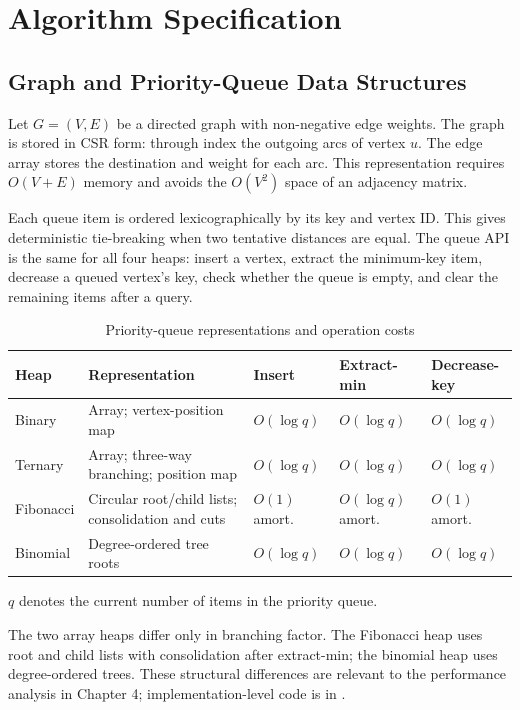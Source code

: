 \documentclass[12pt,a4paper]{report}
\newcommand{\code}[1]{\texttt{\detokenize{#1}}}
\begin{document}
\chapter{Algorithm Specification}

\section{Graph and Priority-Queue Data Structures}
Let $G=(V,E)$ be a directed graph with non-negative edge weights. The graph is
stored in CSR form: \code{offset[u]} through \code{offset[u+1]-1} index the
outgoing arcs of vertex $u$. The edge array stores the destination and weight
for each arc. This representation requires $O(V+E)$ memory and avoids the
$O(V^2)$ space of an adjacency matrix.

Each queue item is ordered lexicographically by its key and vertex ID. This
gives deterministic tie-breaking when two tentative distances are equal. The
queue API is the same for all four heaps: insert a vertex, extract the
minimum-key item, decrease a queued vertex's key, check whether the queue is
empty, and clear the remaining items after a query.

\begin{table}[H]
  \centering
  \caption{Priority-queue representations and operation costs}
  \label{tab:heap-operations}
  \small
  \begin{tabular}{p{1.7cm}p{4.4cm}p{2.0cm}p{2.3cm}p{2.3cm}}
    \toprule
    Heap & Representation & Insert & Extract-min & Decrease-key \\
    \midrule
    Binary & Array; vertex-position map & $O(\log q)$ & $O(\log q)$ & $O(\log q)$ \\
    Ternary & Array; three-way branching; position map & $O(\log q)$ & $O(\log q)$ & $O(\log q)$ \\
    Fibonacci & Circular root/child lists; consolidation and cuts & $O(1)$ amort. & $O(\log q)$ amort. & $O(1)$ amort. \\
    Binomial & Degree-ordered tree roots & $O(\log q)$ & $O(\log q)$ & $O(\log q)$ \\
    \bottomrule
  \end{tabular}
  \vspace{2pt}

  \footnotesize $q$ denotes the current number of items in the priority queue.
\end{table}

The two array heaps differ only in branching factor. The Fibonacci heap uses
root and child lists with consolidation after extract-min; the binomial heap
uses degree-ordered trees. These structural differences are relevant to the
performance analysis in Chapter 4; implementation-level code is in
\code{src/1.c}.
\end{document}
